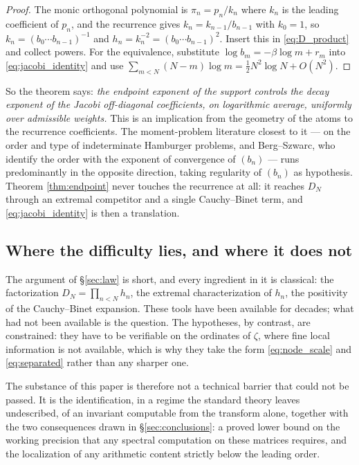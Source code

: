 \documentclass[11pt]{amsart}
\numberwithin{equation}{section}
\theoremstyle{plain}
\theoremstyle{definition}
\theoremstyle{remark}
\begin{document}
\begin{proof}
The monic orthogonal polynomial is $\pi_{n}=p_{n}/k_{n}$ where $k_{n}$ is the leading coefficient of
$p_{n}$, and the recurrence gives $k_{n}=k_{n-1}/b_{n-1}$ with $k_{0}=1$, so
$k_{n}=(b_{0}\cdots b_{n-1})^{-1}$ and $h_{n}=k_{n}^{-2}=(b_{0}\cdots b_{n-1})^{2}$. Insert this in
\eqref{eq:D_product} and collect powers. For the equivalence, substitute
$\log b_{m}=-\beta\log m+r_{m}$ into \eqref{eq:jacobi_identity} and use
$\sum_{m<N}(N-m)\log m=\tfrac12N^{2}\log N+O(N^{2})$.
\end{proof}

So the theorem says: \emph{the endpoint exponent of the support controls the decay exponent of the
Jacobi off-diagonal coefficients, on logarithmic average, uniformly over admissible weights.} This
is an implication from the geometry of the atoms to the recurrence coefficients. The moment-problem
literature closest to it --- \cite{BergPedersen1994} on the order and type of indeterminate Hamburger
problems, and Berg--Szwarc, who identify the order with the exponent of convergence of $(b_{n})$
\cite{BergSzwarc2014} --- runs predominantly in the opposite direction, taking regularity of
$(b_{n})$ as hypothesis. Theorem \ref{thm:endpoint} never touches the recurrence at all: it reaches
$D_{N}$ through an extremal competitor and a single Cauchy--Binet term, and \eqref{eq:jacobi_identity}
is then a translation.

\subsection{Where the difficulty lies, and where it does not}
\label{ss:trivial}

The argument of \S\ref{sec:law} is short, and every ingredient in it is classical: the factorization
$D_{N}=\prod_{n<N}h_{n}$, the extremal characterization of $h_{n}$, the positivity of the
Cauchy--Binet expansion. These tools have been available for decades; what had not been available
is the question. The hypotheses, by contrast, are constrained: they have to be verifiable on the
ordinates of $\zeta$, where fine local information is not available, which is why they take the form
\eqref{eq:node_scale} and \eqref{eq:separated} rather than any sharper one.

The substance of this paper is therefore not a technical barrier that could not be passed. It is the
identification, in a regime the standard theory leaves undescribed, of an invariant computable from
the transform alone, together with the two consequences drawn in \S\ref{sec:conclusions}: a proved
lower bound on the working precision that any spectral computation on these matrices requires, and
the localization of any arithmetic content strictly below the leading order.
\end{document}
